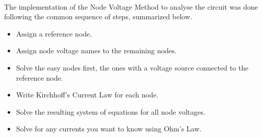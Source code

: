 \paragraph{}
The implementation of the Node Voltage Method to analyse the circuit was done following the common sequence of steps, summarized below.
\begin{itemize}
    \item Assign a reference node.
    \item Assign node voltage names to the remaining nodes.
    \item Solve the easy nodes first, the ones with a voltage source connected to the reference node.
    \item Write Kirchhoff's Current Law for each node.
    \item Solve the resulting system of equations for all node voltages.
    \item Solve for any currents you want to know using Ohm's Law.
\end{itemize}

\pagebreak

